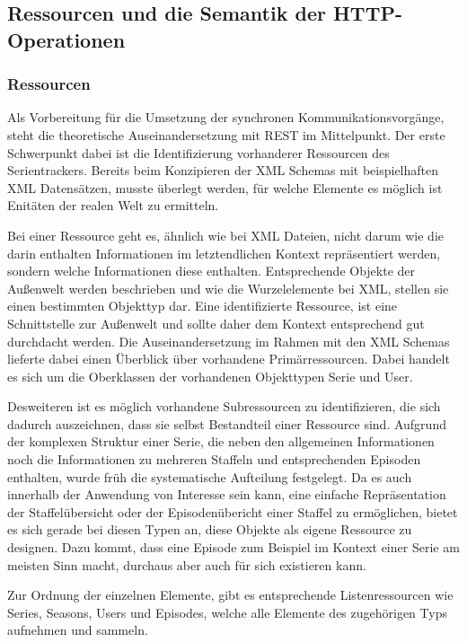 \documentclass[a4paper]{article}
\begin{document}
\newpage

\subsection{Ressourcen und die Semantik der HTTP-Operationen}
\subsubsection{Ressourcen}

Als Vorbereitung für die Umsetzung der synchronen Kommunikationsvorgänge, steht die theoretische Auseinandersetzung mit REST im Mittelpunkt.
Der erste Schwerpunkt dabei ist die Identifizierung vorhanderer Ressourcen des Serientrackers. Bereits beim Konzipieren der XML Schemas mit beispielhaften XML Datensätzen, musste überlegt werden, für welche Elemente es möglich ist Enitäten der realen Welt zu ermitteln.

Bei einer Ressource geht es, ähnlich wie bei XML Dateien, nicht darum wie die darin enthalten Informationen im letztendlichen Kontext repräsentiert werden, sondern welche Informationen diese enthalten. Entsprechende Objekte der Außenwelt werden beschrieben und wie die Wurzelelemente bei XML, stellen sie einen bestimmten Objekttyp dar. Eine identifizierte Ressource, ist eine Schnittstelle zur Außenwelt und sollte daher dem Kontext entsprechend gut durchdacht werden.
Die Auseinandersetzung im Rahmen mit den XML Schemas lieferte dabei einen Überblick über vorhandene Primärressourcen. Dabei handelt es sich um die Oberklassen der vorhandenen Objekttypen Serie und User.

Desweiteren ist es möglich vorhandene Subressourcen zu identifizieren, die sich dadurch auszeichnen, dass sie selbst Bestandteil einer Ressource sind.
Aufgrund der komplexen Struktur einer Serie, die neben den allgemeinen Informationen noch die Informationen zu mehreren Staffeln und entsprechenden Episoden enthalten, wurde früh die systematische Aufteilung festgelegt.
Da es auch innerhalb der Anwendung von Interesse sein kann, eine einfache Repräsentation der Staffelübersicht oder der Episodenübericht einer Staffel zu ermöglichen, bietet es sich gerade bei diesen Typen an, diese Objekte als eigene Ressource zu designen. Dazu kommt, dass eine Episode zum Beispiel im Kontext einer Serie am meisten Sinn macht, durchaus aber auch für sich existieren kann.

Zur Ordnung der einzelnen Elemente, gibt es entsprechende Listenressourcen wie Series, Seasons, Users und Episodes, welche alle Elemente des zugehörigen Typs aufnehmen und sammeln.
\end{document}
